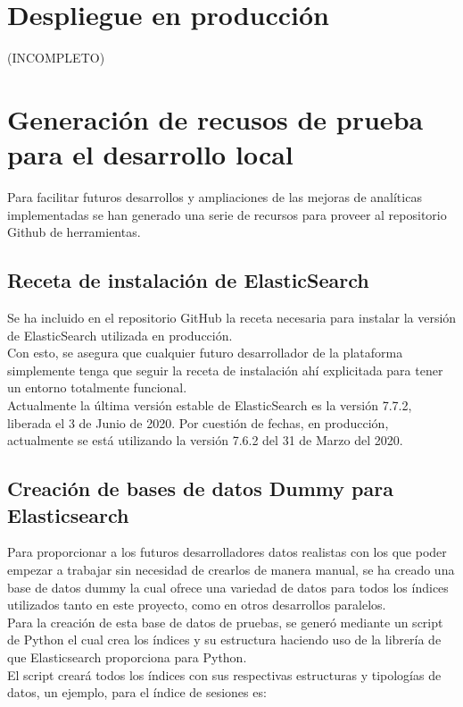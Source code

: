 \documentclass[11pt,a4paper]{book}
\begin{document}
		\section{Despliegue en producción}
			(INCOMPLETO)
		\section{Generación de recusos de prueba para el desarrollo local}
			Para facilitar futuros desarrollos y ampliaciones de las mejoras de analíticas implementadas se han generado una serie de recursos para proveer al repositorio Github de herramientas.
			\subsection{Receta de instalación de ElasticSearch}
				Se ha incluido en el repositorio GitHub la receta necesaria para instalar la versión de ElasticSearch utilizada en producción.\\
				
				Con esto, se asegura que cualquier futuro desarrollador de la plataforma simplemente tenga que seguir la receta de instalación ahí explicitada para tener un entorno totalmente funcional.\\
				
				Actualmente la última versión estable de ElasticSearch es la versión 7.7.2, liberada el 3 de Junio de 2020. Por cuestión de fechas, en producción, actualmente se está utilizando la versión 7.6.2 del 31 de Marzo del 2020.
			\subsection{Creación de bases de datos Dummy para Elasticsearch}
				Para proporcionar a los futuros desarrolladores datos realistas con los que poder empezar a trabajar sin necesidad de crearlos de manera manual, se ha creado una base de datos dummy la cual ofrece una variedad de datos para todos los índices utilizados tanto en este proyecto, como en otros desarrollos paralelos.\\
				
				Para la creación de esta base de datos de pruebas, se generó mediante un script de Python el cual crea los índices y su estructura haciendo uso de la librería de que Elasticsearch proporciona para Python.\\
				
				El script creará todos los índices con sus respectivas estructuras y tipologías de datos, un ejemplo, para el índice de sesiones es:
				
\end{document}
